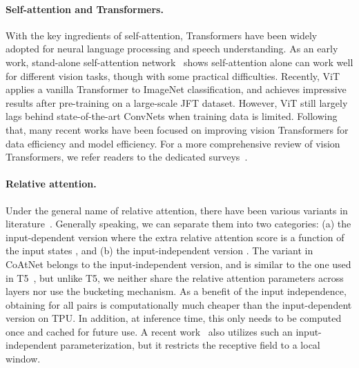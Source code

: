 \documentclass{article}
\newcommand{\name}{CoAtNet\xspace}
\begin{document}
\paragraph{Self-attention and Transformers.} With the key ingredients of self-attention, Transformers have been widely adopted for neural language processing and speech understanding.
As an early work, stand-alone self-attention network~\cite{ramachandran2019stand} shows self-attention alone can work well for different vision tasks, though with some practical difficulties.
Recently, ViT~\cite{dosovitskiy2020image} applies a vanilla Transformer to ImageNet classification, and achieves impressive results after pre-training on a large-scale JFT dataset. However, ViT still largely lags behind state-of-the-art ConvNets when training data is limited. Following that, many recent works have been focused on improving vision Transformers for data efficiency and model efficiency.
For a more comprehensive review of vision Transformers, we refer readers to the dedicated surveys~\cite{han2020survey,khan2021transformers}.

\paragraph{Relative attention.} Under the general name of relative attention, there have been various variants in literature~\cite{shaw2018self,huang2018music,dai2019transformer,ramachandran2019stand,tsai2019transformer,raffel2019exploring}.
Generally speaking, we can separate them into two categories: (a) the input-dependent version where the extra relative attention score is a function of the input states , and (b) the input-independent version .
The variant in \name belongs to the input-independent version, and is similar to the one used in T5~\cite{raffel2019exploring}, but unlike T5, we neither share the relative attention parameters across layers nor use the bucketing mechanism.
As a benefit of the input independence, obtaining  for all  pairs is computationally much cheaper than the input-dependent version on TPU.
In addition, at inference time, this only needs to be computed once and cached for future use.
A recent work~\cite{liu2021swin} also utilizes such an input-independent parameterization, but it restricts the receptive field to a local window.
\end{document}

